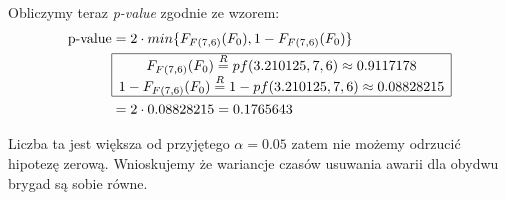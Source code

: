 \documentclass{article}
\begin{document}
Obliczymy teraz \textit{p-value} zgodnie ze wzorem:
\begin{align*}
\text{p-value} & = 2 \cdot min\{ F_{F(7,6)}(F_0), 1 - F_{F(7,6)}(F_0) \} \\
& \begin{array}{|c|}
\hline
F_{F(7,6)}(F_0)  \overset{R}{=} pf(3.210125, 7, 6) \approx 0.9117178 \\
1 - F_{F(7,6)}(F_0) \overset{R}{=} 1 -  pf(3.210125, 7, 6) \approx  0.08828215\\ \hline
\end{array} \\
& = 2 \cdot 0.08828215 = 0.1765643
\end{align*}

Liczba ta jest większa od przyjętego $\alpha = 0.05$ zatem nie możemy odrzucić hipotezę zerową. Wnioskujemy że wariancje czasów usuwania awarii dla obydwu brygad są sobie równe.
\end{document}
